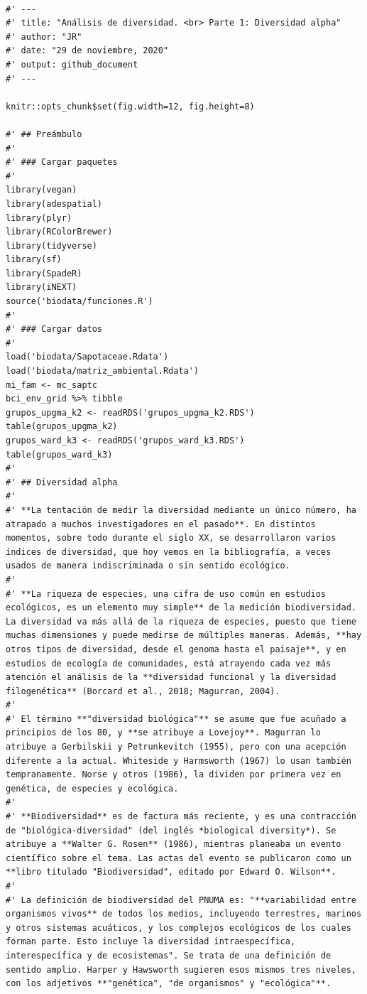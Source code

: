 \documentclass[11pt,]{article}
\begin{document}
\begin{verbatim}

#' ---
#' title: "Análisis de diversidad. <br> Parte 1: Diversidad alpha"
#' author: "JR"
#' date: "29 de noviembre, 2020"
#' output: github_document
#' ---

knitr::opts_chunk$set(fig.width=12, fig.height=8)

#' ## Preámbulo
#' 
#' ### Cargar paquetes
#' 
library(vegan)
library(adespatial)
library(plyr)
library(RColorBrewer)
library(tidyverse)
library(sf)
library(SpadeR)
library(iNEXT)
source('biodata/funciones.R')
#' 
#' ### Cargar datos
#' 
load('biodata/Sapotaceae.Rdata')
load('biodata/matriz_ambiental.Rdata')
mi_fam <- mc_saptc
bci_env_grid %>% tibble
grupos_upgma_k2 <- readRDS('grupos_upgma_k2.RDS')
table(grupos_upgma_k2)
grupos_ward_k3 <- readRDS('grupos_ward_k3.RDS')
table(grupos_ward_k3)
#' 
#' ## Diversidad alpha
#' 
#' **La tentación de medir la diversidad mediante un único número, ha atrapado a muchos investigadores en el pasado**. En distintos momentos, sobre todo durante el siglo XX, se desarrollaron varios índices de diversidad, que hoy vemos en la bibliografía, a veces usados de manera indiscriminada o sin sentido ecológico.
#' 
#' **La riqueza de especies, una cifra de uso común en estudios ecológicos, es un elemento muy simple** de la medición biodiversidad. La diversidad va más allá de la riqueza de especies, puesto que tiene muchas dimensiones y puede medirse de múltiples maneras. Además, **hay otros tipos de diversidad, desde el genoma hasta el paisaje**, y en estudios de ecología de comunidades, está atrayendo cada vez más atención el análisis de la **diversidad funcional y la diversidad filogenética** (Borcard et al., 2018; Magurran, 2004).
#' 
#' El término **"diversidad biológica"** se asume que fue acuñado a principios de los 80, y **se atribuye a Lovejoy**. Magurran lo atribuye a Gerbilskii y Petrunkevitch (1955), pero con una acepción diferente a la actual. Whiteside y Harmsworth (1967) lo usan también tempranamente. Norse y otros (1986), la dividen por primera vez en genética, de especies y ecológica.
#' 
#' **Biodiversidad** es de factura más reciente, y es una contracción de "biológica-diversidad" (del inglés *biological diversity*). Se atribuye a **Walter G. Rosen** (1986), mientras planeaba un evento científico sobre el tema. Las actas del evento se publicaron como un **libro titulado "Biodiversidad", editado por Edward O. Wilson**.
#' 
#' La definición de biodiversidad del PNUMA es: "**variabilidad entre organismos vivos** de todos los medios, incluyendo terrestres, marinos y otros sistemas acuáticos, y los complejos ecológicos de los cuales forman parte. Esto incluye la diversidad intraespecífica, interespecífica y de ecosistemas". Se trata de una definición de sentido amplio. Harper y Hawsworth sugieren esos mismos tres niveles, con los adjetivos **"genética", "de organismos" y "ecológica"**.

\end{verbatim}
\end{document}
